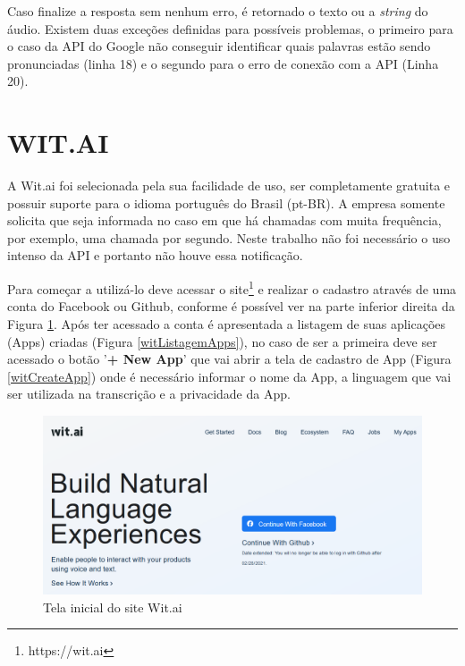 Caso finalize a resposta sem nenhum erro, é retornado o texto ou a \textit{string} do áudio. Existem duas exceções definidas para possíveis problemas, o primeiro para o caso da API do Google não conseguir identificar quais palavras estão sendo pronunciadas (linha 18) e o segundo para o erro de conexão com a API (Linha 20). 

\section{WIT.AI}

A {Wit.ai} foi selecionada pela sua  facilidade de uso, ser completamente gratuita e possuir suporte para o idioma português do Brasil (pt-BR). A empresa  somente solicita que seja informada no caso em que há chamadas com muita frequência, por exemplo, uma  chamada por segundo. Neste trabalho não foi necessário o uso intenso da API e portanto não houve essa notificação.

Para começar a utilizá-lo deve acessar o site\footnote{https://wit.ai} e realizar o cadastro através de uma conta do Facebook ou Github, conforme é possível ver na parte inferior direita da Figura \ref{witInicio}. Após ter acessado a conta é apresentada a listagem de suas aplicações (Apps) criadas (Figura \ref{witListagemApps}), no caso de ser a primeira deve ser acessado o botão '\textbf{+ New App}' que vai abrir a tela de cadastro de App (Figura \ref{witCreateApp}) onde é necessário informar o nome da App, a linguagem que vai ser utilizada na transcrição e a privacidade da App. 

\begin{figure}[h!]
\centering
\caption{Tela inicial do site Wit.ai}
\label{witInicio}
\includegraphics[width=150mm]{images/ConfigurarWit/witTelaInicial.PNG}
\end{figure}

